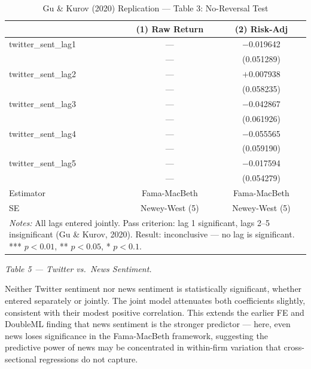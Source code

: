 \documentclass[12pt]{article}
\begin{document}
\begin{table}[htbp]
\centering
\caption{Gu \& Kurov (2020) Replication --- Table 3: No-Reversal Test}
\label{tab:gk_t3}
\begin{tabular}{lcc}
\hline\hline
 & (1) Raw Return & (2) Risk-Adj \\
\hline
twitter\_sent\_lag1 & --- & $-$0.019642 \\
 & --- & (0.051289) \\
twitter\_sent\_lag2 & --- & $+$0.007938 \\
 & --- & (0.058235) \\
twitter\_sent\_lag3 & --- & $-$0.042867 \\
 & --- & (0.061926) \\
twitter\_sent\_lag4 & --- & $-$0.055565 \\
 & --- & (0.059190) \\
twitter\_sent\_lag5 & --- & $-$0.017594 \\
 & --- & (0.054279) \\
\hline
Estimator & Fama-MacBeth & Fama-MacBeth \\
SE & Newey-West (5) & Newey-West (5) \\
\hline\hline
\multicolumn{3}{p{0.9\linewidth}}{\footnotesize \textit{Notes:} All lags entered jointly. Pass criterion: lag 1 significant, lags 2--5 insignificant (Gu \& Kurov, 2020). Result: inconclusive --- no lag is significant. *** $p<0.01$, ** $p<0.05$, * $p<0.1$.}
\end{tabular}
\end{table}

\medskip

\noindent\textit{Table 5 --- Twitter vs.\ News Sentiment.}

Neither Twitter sentiment nor news sentiment is statistically significant, whether entered separately or jointly. The joint model attenuates both coefficients slightly, consistent with their modest positive correlation. This extends the earlier FE and DoubleML finding that news sentiment is the stronger predictor --- here, even news loses significance in the Fama-MacBeth framework, suggesting the predictive power of news may be concentrated in within-firm variation that cross-sectional regressions do not capture.
\end{document}
